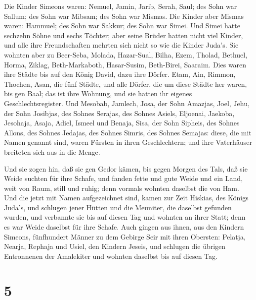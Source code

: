  Die Kinder Simeons waren: Nemuel, Jamin, Jarib, Serah,
Saul;  des Sohn war Sallum; des Sohn war Mibsam; des Sohn
war Mismas.  Die Kinder aber Mismas waren: Hammuel; des
Sohn war Sakkur; des Sohn war Simei.  Und Simei hatte
sechzehn Söhne und sechs Töchter; aber seine Brüder hatten nicht viel
Kinder, und alle ihre Freundschaften mehrten sich nicht so wie die
Kinder Juda's.  Sie wohnten aber zu Beer-Seba, Molada,
Hazar-Sual,  Bilha, Ezem, Tholad,  Bethuel,
Horma, Ziklag,  Beth-Markaboth, Hasar-Susim, Beth-Birei,
Saaraim. Dies waren ihre Städte bis auf den König David, dazu ihre
Dörfer.  Etam, Ain, Rimmon, Thochen, Asan, die fünf Städte,
 und alle Dörfer, die um diese Städte her waren, bis gen
Baal; das ist ihre Wohnung, und sie hatten ihr eigenes
Geschlechtsregister.  Und Mesobab, Jamlech, Josa, der Sohn
Amazjas,  Joel, Jehu, der Sohn Josibjas, des Sohnes
Serajas, des Sohnes Asiels,  Eljoenai, Jaekoba, Jesohaja,
Asaja, Adiel, Ismeel und Benaja,  Sisa, der Sohn Sipheis,
des Sohnes Allons, des Sohnes Jedajas, des Sohnes Simris, des Sohnes
Semajas:  diese, die mit Namen genannt sind, waren Fürsten
in ihren Geschlechtern; und ihre Vaterhäuser breiteten sich aus in die
Menge.

 Und sie zogen hin, daß sie gen Gedor kämen, bis gegen
Morgen des Tals, daß sie Weide suchten für ihre Schafe, 
und fanden fette und gute Weide und ein Land, weit von Raum, still und
ruhig; denn vormals wohnten daselbst die von Ham.  Und die
jetzt mit Namen aufgezeichnet sind, kamen zur Zeit Hiskias, des Königs
Juda's, und schlugen jener Hütten und die Meuniter, die daselbst
gefunden wurden, und verbannte sie bis auf diesen Tag und wohnten an
ihrer Statt; denn es war Weide daselbst für ihre Schafe. 
Auch gingen aus ihnen, aus den Kindern Simeons, fünfhundert Männer zu
dem Gebirge Seir mit ihren Obersten: Pelatja, Nearja, Rephaja und Usiel,
den Kindern Jeseis,  und schlugen die übrigen Entronnenen
der Amalekiter und wohnten daselbst bis auf diesen Tag.

\hypertarget{section-4}{%
\section{5}\label{section-4}}

